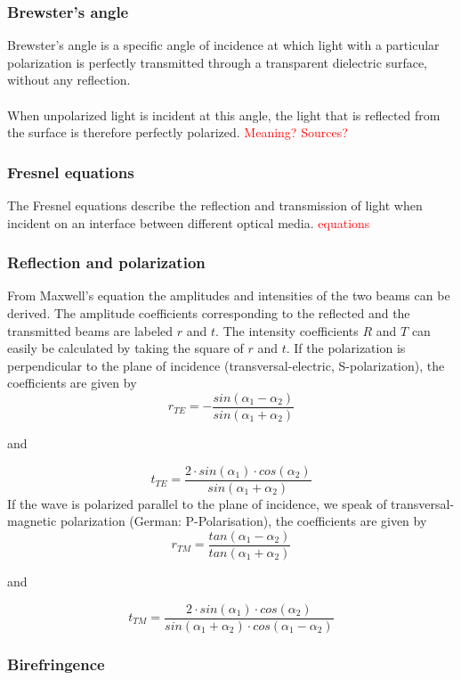 \subsubsection{Brewster's angle}
Brewster's angle is a specific angle of incidence at which light with a
particular polarization is perfectly transmitted through a transparent
dielectric surface, without any reflection. \\ \\ When unpolarized light
is incident at this angle, the light that is reflected from the surface is
therefore perfectly polarized. \textcolor{red}{Meaning? Sources?}

\subsubsection{Fresnel equations}
The Fresnel equations describe the reflection and transmission of light
when incident on an interface between different optical media.
\textcolor{red}{equations}

\subsubsection{Reflection and polarization}
From Maxwell's equation the amplitudes and intensities of the two beams
can be derived. The amplitude coefficients corresponding to the reflected and
the transmitted beams are labeled $r$ and $t$. The intensity coefficients
$R$ and $T$ can easily be calculated by taking the square of $r$ and $t$.
If the polarization is perpendicular to the plane of incidence
(transversal-electric, S-polarization), the coefficients are given by
$$r_{TE}=-\frac{sin(\alpha_1-\alpha_2)}{sin(\alpha_1+\alpha_2)}$$
\begin{center}and\end{center} $$t_{TE}=\frac{2\cdot sin(\alpha_1)\cdot
cos(\alpha_2)}{sin(\alpha_1+\alpha_2)}$$
If the wave is polarized parallel to the plane of incidence, we speak of
transversal-magnetic polarization (German: P-Polarisation), the coefficients
are given by
$$r_{TM}=\frac{tan(\alpha_1-\alpha_2)}{tan(\alpha_1+\alpha_2)}$$
\begin{center}and\end{center} $$t_{TM}=\frac{2\cdot sin(\alpha_1)\cdot
 cos(\alpha_2)}{sin(\alpha_1+\alpha_2)\cdot
cos(\alpha_1-\alpha_2)}$$

\subsubsection{Birefringence}

